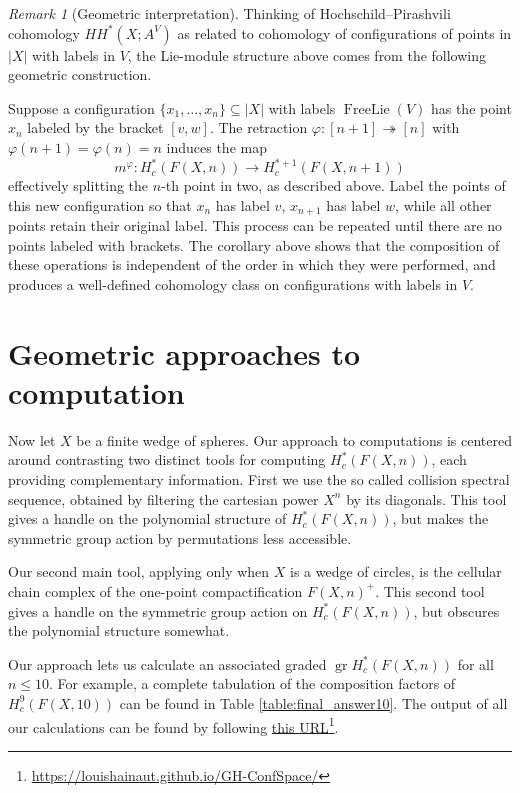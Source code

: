 \documentclass[12pt]{article}
\DeclareMathOperator{\gr}{gr}
\theoremstyle{plain}
\theoremstyle{definition}
\theoremstyle{remark}
\newtheorem{rmk}[thm]{Remark}
\begin{document}
\begin{rmk}[Geometric interpretation]
Thinking of Hochschild--Pirashvili cohomology $HH^*(X;A^V)$ as related to cohomology of configurations of points in $|X|$ with labels in $V$, the Lie-module structure above comes from the following geometric construction.

Suppose a configuration $\{x_1,\ldots,x_n\}\subseteq |X|$ with labels $\operatorname{FreeLie}(V)$ has the point $x_n$ labeled by the bracket $[v,w]$. The retraction $\varphi:[n+1]\twoheadrightarrow [n]$ with $\varphi(n+1)=\varphi(n) = n$ induces the map
\[
m^\varphi: H^*_c(F(X,n)) \to H^{*+1}_c(F(X,n+1))
\]
effectively splitting the $n$-th point in two, as described above. Label the points of this new configuration so that $x_n$ has label $v$, $x_{n+1}$ has label $w$, while all other points retain their original label.
This process can be repeated until there are no points labeled with brackets. The corollary above shows that the composition of these operations is independent of the order in which they were performed, and produces a well-defined cohomology class on configurations with labels in $V$.
\end{rmk}

\section{Geometric approaches to computation} \label{sec:geometric approach}
Now let $X$ be a finite wedge of spheres. Our approach to computations is centered around contrasting two distinct tools for computing $H^*_c(F(X,n))$, each providing complementary information. First we use the so called collision spectral sequence, obtained by filtering the cartesian power $X^n$ by its diagonals. This tool gives a handle on the polynomial structure of $H^*_c(F(X,n))$, but makes the symmetric group action by permutations less accessible.

Our second main tool, applying only when $X$ is a wedge of circles, is the cellular chain complex of the one-point compactification $F(X,n)^+$. This second tool gives a handle on the symmetric group action on $H^*_c(F(X,n))$, but obscures the polynomial structure somewhat.

Our approach lets us calculate an associated graded $\gr H^*_c(F(X,n))$ for all $n\leq 10$. For example, a complete tabulation of the composition factors of $H^9_c(F(X,10))$ can be found in Table \ref{table:final_answer10}. The output of all our calculations can be found by following \href{https://louishainaut.github.io/GH-ConfSpace/}{this URL}\footnote{\url{https://louishainaut.github.io/GH-ConfSpace/}}.
\end{document}
